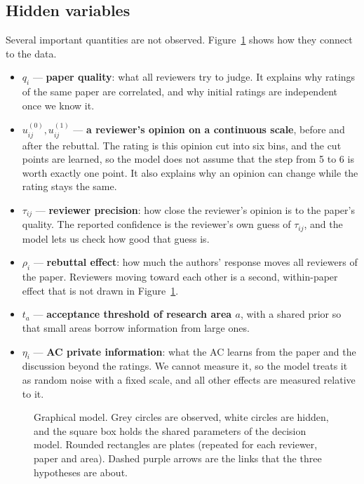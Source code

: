 \documentclass[11pt]{article}
\begin{document}
\subsection{Hidden variables}

Several important quantities are not observed. Figure~\ref{fig:model} shows how they connect to the data.

\begin{itemize}
\item $q_i$ --- \textbf{paper quality}: what all reviewers try to judge. It explains why ratings of the same paper are correlated, and why initial ratings are independent once we know it.
\item $u^{(0)}_{ij}, u^{(1)}_{ij}$ --- \textbf{a reviewer's opinion on a continuous scale}, before and after the rebuttal. The rating is this opinion cut into six bins, and the cut points are learned, so the model does not assume that the step from 5 to 6 is worth exactly one point. It also explains why an opinion can change while the rating stays the same.
\item $\tau_{ij}$ --- \textbf{reviewer precision}: how close the reviewer's opinion is to the paper's quality. The reported confidence is the reviewer's own guess of $\tau_{ij}$, and the model lets us check how good that guess is.
\item $\rho_i$ --- \textbf{rebuttal effect}: how much the authors' response moves all reviewers of the paper. Reviewers moving toward each other is a second, within-paper effect that is not drawn in Figure~\ref{fig:model}.
\item $t_a$ --- \textbf{acceptance threshold of research area $a$}, with a shared prior so that small areas borrow information from large ones.
\item $\eta_i$ --- \textbf{AC private information}: what the AC learns from the paper and the discussion beyond the ratings. We cannot measure it, so the model treats it as random noise with a fixed scale, and all other effects are measured relative to it.
\end{itemize}

\begin{figure}[t]
\centering

\caption{Graphical model. Grey circles are observed, white circles are hidden, and the square box holds the shared parameters of the decision model. Rounded rectangles are plates (repeated for each reviewer, paper and area). Dashed purple arrows are the links that the three hypotheses are about.}
\label{fig:model}
\end{figure}
\end{document}
